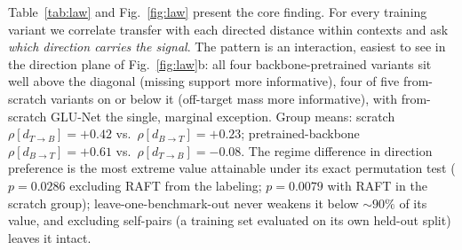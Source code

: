 \documentclass[runningheads]{llncs}
\newcommand{\dtb}{d_{T\to B}}
\newcommand{\dbt}{d_{B\to T}}
\begin{document}
\begin{table}[t]
\centering
\caption{\textbf{The identical analysis in appearance (DINO) space: the
negative control for Table~\ref{tab:law}.} No DINO distance---directed,
symmetric, or W2---is a usable positive predictor for any
architecture$\times$regime in either target stratum, and on semantic targets
it is consistently wrong-signed. Whatever Table~\ref{tab:law} captures lives
in motion, not in what the frames look like. Columns and stratification as in
Table~\ref{tab:law}.}
\label{tab:lawdino}
\footnotesize
\setlength{\tabcolsep}{4pt}

\end{table}

Table~\ref{tab:law} and Fig.~\ref{fig:law} present the core finding. For
every training variant we correlate transfer with each directed distance
within contexts and ask \emph{which direction carries the signal}. The
pattern is an interaction, easiest to see in the direction plane of
Fig.~\ref{fig:law}b: all four backbone-pretrained variants sit well above
the diagonal (missing support more informative), four of five from-scratch
variants on or below it (off-target mass more informative), with from-scratch
GLU-Net the single, marginal exception. Group means: scratch
$\rho[\dtb]{=}{+}0.42$ vs.\ $\rho[\dbt]{=}{+}0.23$; pretrained-backbone
$\rho[\dbt]{=}{+}0.61$ vs.\ $\rho[\dtb]{=}{-}0.08$. The regime difference in
direction preference is the most extreme value attainable under its exact
permutation test ($p{=}0.0286$ excluding RAFT from the labeling; $p{=}0.0079$
with RAFT in the scratch group); leave-one-benchmark-out never weakens it
below ${\sim}90\%$ of its value, and excluding self-pairs (a training set evaluated
on its own held-out split) leaves it intact.
\end{document}

